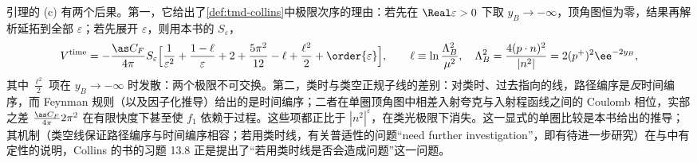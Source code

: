 引理的 (c) 有两个后果。第一，它给出了\cref{def:tmd-collins}中极限次序的理由：若先在 $\Real\varepsilon>0$ 下取 $y_B\to-\infty$，顶角图恒为零，结果再解析延拓到全部 $\varepsilon$；若先展开 $\varepsilon$，则用本书的 $S_\varepsilon$，
\begin{equation}\label{eq:tmd-vertex-expanded}
V^{\mathrm{time}}=-\frac{\as C_F}{4\pi}S_\varepsilon\Big[\frac1{\varepsilon^2}+\frac{1-\ell}{\varepsilon}+2+\frac{5\pi^2}{12}-\ell+\frac{\ell^2}{2}+\order{\varepsilon}\Big],\qquad \ell\equiv\ln\frac{\Lambda_B^2}{\mu^2},\quad\Lambda_B^2=\frac{4(p\cdot n)^2}{|n^2|}=2(p^+)^2\ee^{-2y_B},
\end{equation}
其中 $\frac{\ell^2}2$ 项在 $y_B\to-\infty$ 时发散：两个极限不可交换。第二，类时与类空正规子线的差别：对类时、过去指向的线，路径编序是\emph{反}时间编序，而 Feynman 规则（以及因子化推导）给出的是时间编序；二者在单圈顶角图中相差入射夸克与入射程函线之间的 Coulomb 相位，实部之差 $\frac{\as C_F}{4\pi}2\pi^2$ 在有限快度下甚至使 $f_1$ 依赖于过程。这些项都正比于 $|n^2|^\varepsilon$，在类光极限下消失。这一显式的单圈比较是本书给出的推导；其机制（类空线保证路径编序与时间编序相容；若用类时线，有关普适性的问题“need further investigation”，即有待进一步研究）在\cite{CollinsMetz2004}与\cite[第~10.6.4~节、第~10.11.1~节，第~381~页]{Collins2011}中有定性的说明，Collins 的书的习题 13.8 正是提出了“若用类时线是否会造成问题”这一问题\cite[第~538~页]{Collins2011}。
